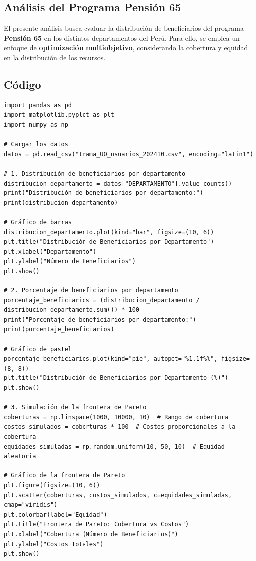\documentclass[12pt]{article}
\begin{document}
\subsection*{Análisis del Programa Pensión 65}

El presente análisis busca evaluar la distribución de beneficiarios del programa \textbf{Pensión 65} en los distintos departamentos del Perú. Para ello, se emplea un enfoque de \textbf{optimización multiobjetivo}, considerando la cobertura y equidad en la distribución de los recursos.

\subsection*{Código}

\begin{lstlisting}[style=python]
import pandas as pd
import matplotlib.pyplot as plt
import numpy as np

# Cargar los datos
datos = pd.read_csv("trama_UO_usuarios_202410.csv", encoding="latin1")

# 1. Distribución de beneficiarios por departamento
distribucion_departamento = datos["DEPARTAMENTO"].value_counts()
print("Distribución de beneficiarios por departamento:")
print(distribucion_departamento)

# Gráfico de barras
distribucion_departamento.plot(kind="bar", figsize=(10, 6))
plt.title("Distribución de Beneficiarios por Departamento")
plt.xlabel("Departamento")
plt.ylabel("Número de Beneficiarios")
plt.show()

# 2. Porcentaje de beneficiarios por departamento
porcentaje_beneficiarios = (distribucion_departamento / distribucion_departamento.sum()) * 100
print("Porcentaje de beneficiarios por departamento:")
print(porcentaje_beneficiarios)

# Gráfico de pastel
porcentaje_beneficiarios.plot(kind="pie", autopct="%1.1f%%", figsize=(8, 8))
plt.title("Distribución de Beneficiarios por Departamento (%)")
plt.show()

# 3. Simulación de la frontera de Pareto
coberturas = np.linspace(1000, 10000, 10)  # Rango de cobertura
costos_simulados = coberturas * 100  # Costos proporcionales a la cobertura
equidades_simuladas = np.random.uniform(10, 50, 10)  # Equidad aleatoria

# Gráfico de la frontera de Pareto
plt.figure(figsize=(10, 6))
plt.scatter(coberturas, costos_simulados, c=equidades_simuladas, cmap="viridis")
plt.colorbar(label="Equidad")
plt.title("Frontera de Pareto: Cobertura vs Costos")
plt.xlabel("Cobertura (Número de Beneficiarios)")
plt.ylabel("Costos Totales")
plt.show()
\end{lstlisting}
\end{document}
